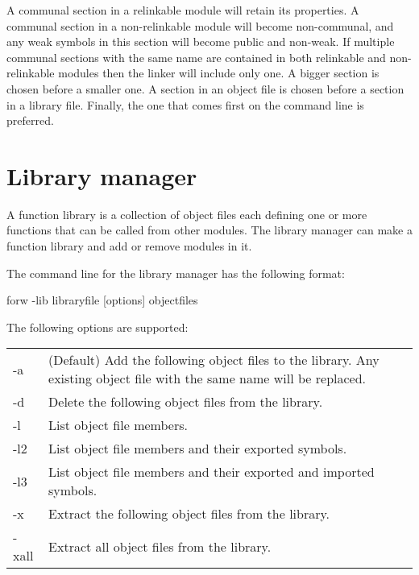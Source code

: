 \documentclass[forwardcom.tex]{subfiles}
\begin{document}
A communal section in a relinkable module will retain its properties. A communal section in a non-relinkable module will become non-communal, and any weak symbols in this section will become public and non-weak. If multiple communal sections with the same name are contained in both relinkable and non-relinkable modules then the linker will include only one.
A bigger section is chosen before a smaller one. A section in an object file is chosen before a section in a library file. Finally, the one that comes first on the command line is preferred.
\vspace{2mm}


\section{Library manager} \label{libraryManager}

A function library is a collection of object files each defining one or more functions that can be called from other modules. The library manager can make a function library and add or remove modules in it.
\vspace{2mm}

The command line for the library manager has the following format:
\vspace{2mm}

\hspace{5mm} {\ttfamily forw -lib libraryfile [options] objectfiles}
\vspace{2mm}

The following options are supported:\\
\begin{tabular}{|p{10mm}p{150mm}|}
\hline
-a & (Default) Add the following object files to the library. Any existing object file with the same name will be replaced.\\
-d & Delete the following object files from the library.\\
-l & List object file members.\\
-l2 & List object file members and their exported symbols.\\
-l3 & List object file members and their exported and imported symbols.\\
-x & Extract the following object files from the library.\\
-xall & Extract all object files from the library. \\
\hline
\end{tabular}
\vspace{2mm}
\end{document}
